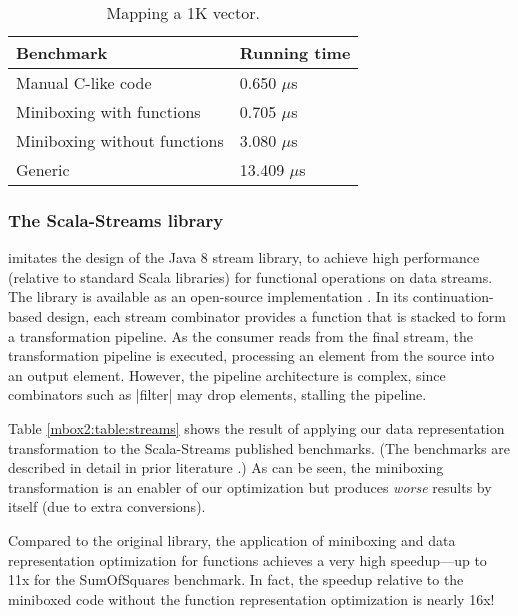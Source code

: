 \begin{table}[t]
  \begin{tabularx}{0.98\textwidth}{|g *{1}{|Y}|} \hline
    \textbf{Benchmark}             &  \textbf{Running time} \\ \hline
    Manual C-like code             &         0.650 $\mu$s \\
    Miniboxing with functions      &         0.705 $\mu$s \\
    Miniboxing without functions   &         3.080 $\mu$s \\
    Generic                        &        13.409 $\mu$s \\ \hline
  \end{tabularx}

  \caption{Mapping a 1K vector.}
  \label{mbox2:table:framian}

\end{table}

\subsubsection*{The Scala-Streams library} \cite{biboudis_clash_2014} imitates the design of the Java 8 stream library, to achieve high performance (relative to standard Scala libraries) for functional operations on data streams. The library is available as an open-source implementation \cite{biboudis-streams}. In its continuation-based design, each stream combinator provides a function that is stacked to form a transformation pipeline. As the consumer reads from the final stream, the transformation pipeline is executed, processing an element from the source into an output element. However, the pipeline architecture is complex, since combinators such as |filter| may drop elements, stalling the pipeline.

Table \ref{mbox2:table:streams} shows the result of applying our data
representation transformation to the Scala-Streams published
benchmarks. (The benchmarks are described in detail in prior
literature \cite{biboudis_clash_2014,biboudis_et_al:ECOOP:short}.) As can be seen, the miniboxing
transformation is an enabler of our optimization but produces
\emph{worse} results by itself (due to extra conversions).

Compared to the original library, the application of miniboxing and
data representation optimization for functions achieves a very high
speedup---up to 11x for the SumOfSquares benchmark. In fact, the
speedup relative to the miniboxed code without the function
representation optimization is nearly 16x! 


